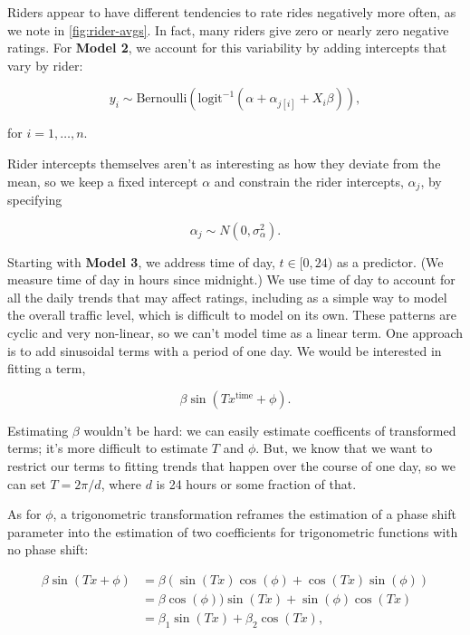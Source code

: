 \documentclass[12pt,twoside]{reedthesis}
\begin{document}
  Riders appear to have different tendencies to rate rides negatively more
  often, as we note in \autoref{fig:rider-avgs}. In fact, many riders give
  zero or nearly zero negative ratings. For \textbf{Model 2}, we account
  for this variability by adding intercepts that vary by rider:
  
  \begin{equation}
  y_i \sim \text{Bernoulli} \left(
  \text{logit}^{-1} \left( \alpha + \alpha_{j[i]} + X_i \beta \right)
  \right),
  \end{equation}
  
  for \(i = 1, \ldots, n\).
  
  Rider intercepts themselves aren't as interesting as how they deviate
  from the mean, so we keep a fixed intercept \(\alpha\) and constrain the
  rider intercepts, \(\alpha_j\), by specifying
  
  \[\alpha_j \sim N(0, \sigma^2_\alpha).\]
  
  Starting with \textbf{Model 3}, we address time of day,
  \(t \in [0, 24)\) as a predictor. (We measure time of day in hours since
  midnight.) We use time of day to account for all the daily trends that
  may affect ratings, including as a simple way to model the overall
  traffic level, which is difficult to model on its own. These patterns
  are cyclic and very non-linear, so we can't model time as a linear term.
  One approach is to add sinusoidal terms with a period of one day. We
  would be interested in fitting a term,
  
  \[\beta \sin (T x^{\text{time}} + \phi).\]
  
  Estimating \(\beta\) wouldn't be hard: we can easily estimate
  coefficents of transformed terms; it's more difficult to estimate \(T\)
  and \(\phi\). But, we know that we want to restrict our terms to fitting
  trends that happen over the course of one day, so we can set
  \(T = 2 \pi / d\), where \(d\) is 24 hours or some fraction of that.
  
  As for \(\phi\), a trigonometric transformation reframes the estimation
  of a phase shift parameter into the estimation of two coefficients for
  trigonometric functions with no phase shift:
  
  \begin{align*}
  \beta \sin (T x + \phi) &= 
  \beta \left( \sin (T x) \cos (\phi) + \cos (T x) \sin (\phi) \right)\\
  &= \beta \cos (\phi)) \sin (T x) + \sin (\phi) \cos (T x)\\
  &= \beta_1 \sin (T x) + \beta_2 \cos (T x),
  \end{align*}
  
\end{document}
